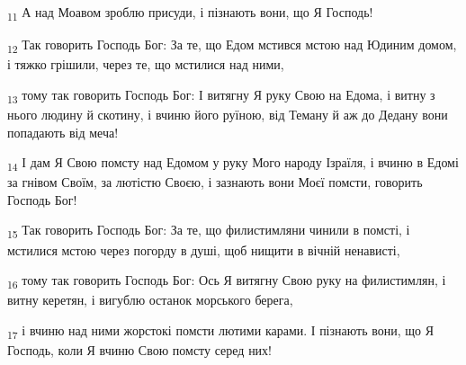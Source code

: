 \begin{tcolorbox}
\textsubscript{11} А над Моавом зроблю присуди, і пізнають вони, що Я Господь!
\end{tcolorbox}
\begin{tcolorbox}
\textsubscript{12} Так говорить Господь Бог: За те, що Едом мстився мстою над Юдиним домом, і тяжко грішили, через те, що мстилися над ними,
\end{tcolorbox}
\begin{tcolorbox}
\textsubscript{13} тому так говорить Господь Бог: І витягну Я руку Свою на Едома, і витну з нього людину й скотину, і вчиню його руїною, від Теману й аж до Дедану вони попадають від меча!
\end{tcolorbox}
\begin{tcolorbox}
\textsubscript{14} І дам Я Свою помсту над Едомом у руку Мого народу Ізраїля, і вчиню в Едомі за гнівом Своїм, за лютістю Своєю, і зазнають вони Моєї помсти, говорить Господь Бог!
\end{tcolorbox}
\begin{tcolorbox}
\textsubscript{15} Так говорить Господь Бог: За те, що филистимляни чинили в помсті, і мстилися мстою через погорду в душі, щоб нищити в вічній ненависті,
\end{tcolorbox}
\begin{tcolorbox}
\textsubscript{16} тому так говорить Господь Бог: Ось Я витягну Свою руку на филистимлян, і витну керетян, і вигублю останок морського берега,
\end{tcolorbox}
\begin{tcolorbox}
\textsubscript{17} і вчиню над ними жорстокі помсти лютими карами. І пізнають вони, що Я Господь, коли Я вчиню Свою помсту серед них!
\end{tcolorbox}
